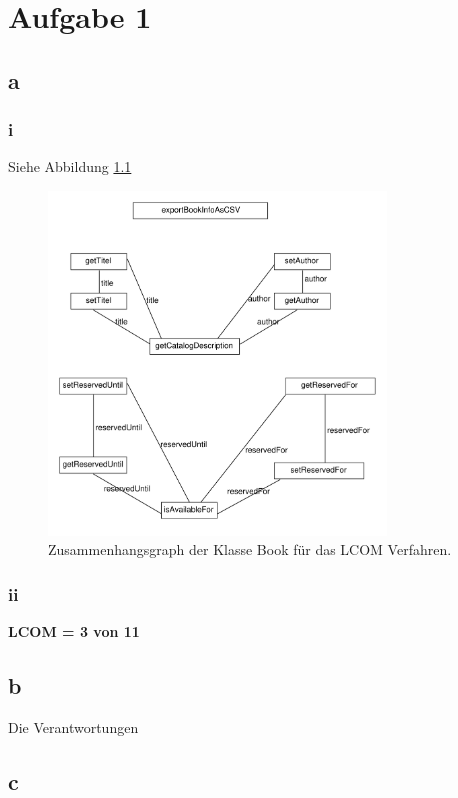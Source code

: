 \chapter{Aufgabe 1 }
\section*{a}
\subsection*{i}
Siehe Abbildung \ref{fig:graphLCOM}

\begin{figure}
	\centering
	\includegraphics[width=0.8\textwidth, clip]{images/graphLCOM.pdf}
	\caption{Zusammenhangsgraph der Klasse Book für das  LCOM Verfahren. }
	\label{fig:graphLCOM}
\end{figure}
\subsection*{ii}
\textbf{LCOM = 3 von 11}



\section*{b}
Die Verantwortungen 


\section{c}


